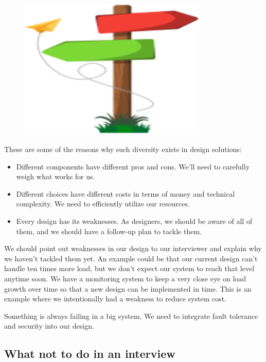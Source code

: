 \begin{figure}[htbp]
 \centering
 \includegraphics[width=0.8\textwidth]{Images/chapter_1/section_6043988183744512/4900255865110528.png}
 
\end{figure}

These are some of the reasons why such diversity exists in design solutions:

\begin{itemize}
\tightlist
\item
Different components have different pros and cons. We'll need to carefully weigh what works for us.
\item
Different choices have different costs in terms of money and technical complexity. We need to efficiently utilize our resources.
\item
Every design has its weaknesses. As designers, we should be aware of all of them, and we should have a follow-up plan to tackle them.
\end{itemize}

We should point out weaknesses in our design to our interviewer and explain why we haven't tackled them yet. An example could be that our current design can't handle ten times more load, but we don't expect our system to reach that level anytime soon. We have a monitoring system to keep a very close eye on load growth over time so that a new design can be implemented in time. This is an example where we intentionally had a weakness to reduce system cost.

Something is always failing in a big system. We need to integrate fault tolerance and security into our design.

\subsection{What not to do in an interview}\label{u-bGj6YfeZtyIiJjmJ1vD}

